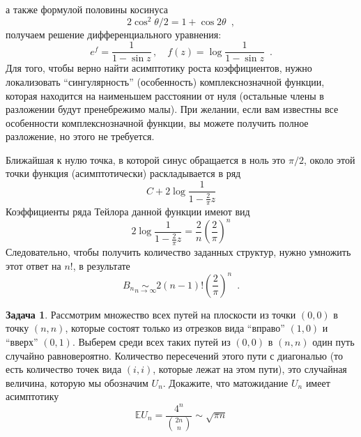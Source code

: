 \documentclass[a5paper]{article}
\theoremstyle{definition}
\newtheorem{problem}{Задача}
\begin{document}
а также формулой половины косинуса
\begin{equation}
    2 \cos^2 \theta/2 = 1 + \cos 2 \theta
    \enspace ,
\end{equation}
получаем решение дифференциального уравнения:
\begin{equation}
    e^f = \dfrac{1}{1 - \sin z}
    \, , \quad
    f(z) = \log \dfrac{1}{1 - \sin z}
    \enspace .
\end{equation}
Для того, чтобы верно найти асимптотику роста коэффициентов, нужно локализовать
``сингулярность'' (особенность) комплекснозначной функции, которая находится на
наименьшем расстоянии от нуля (остальные члены в разложении будут пренебрежимо
малы). При желании, если вам известны все особенности комплекснозначной функции,
вы можете получить полное разложение, но этого не требуется.

Ближайшая к нулю точка, в которой синус обращается в ноль это \( \pi / 2
\), около этой точки функция (асимптотически) раскладывается в ряд
\begin{equation}
    C + 2 \log \dfrac{1}{1 - \frac{2}{\pi} z}
\end{equation} 
Коэффициенты ряда Тейлора данной функции имеют вид
\begin{equation}
    [z^n] 2\log \dfrac{1}{1 - \frac{2}{\pi}z} = \dfrac{2}{n} \left( \frac{2}{\pi}
\right)^n 
\end{equation}
Следовательно, чтобы получить количество заданных структур, нужно умножить этот
ответ на \( n! \), в результате
\begin{equation}
    B_n \underset{n \to \infty}\sim 2 (n-1)! \left( \frac{2}{\pi} \right)^n
\enspace .
\end{equation}

\begin{problem}
Рассмотрим множество всех путей на плоскости из точки \( (0,0) \) в точку \(
(n,n) \), которые состоят только из отрезков вида ``вправо'' \( (1,0) \) и ``вверх'' \(
(0,1) \). Выберем среди всех таких путей из \( (0,0) \) в \(
(n,n) \) один путь случайно равновероятно. Количество пересечений этого пути с
диагональю (то есть количество точек вида \( (i,i) \), которые лежат на этом
пути), это случайная величина, которую мы обозначим \( U_n \). Докажите, что
матожидание \( U_n \) имеет асимптотику
\begin{equation}
    \mathbb E U_n = \dfrac{4^n}{ {2n \choose n}} \sim \sqrt{\pi n}
\end{equation}
\end{problem}
\end{document}
